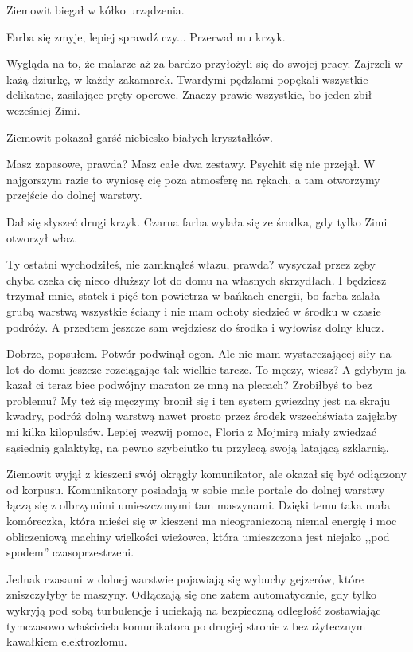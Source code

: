 Ziemowit biegał w kółko urządzenia.

\ds{} Farba się zmyje, lepiej sprawdź czy... \dm{} Przerwał mu krzyk. \de{}

Wygląda na to, że malarze aż za bardzo przyłożyli się do swojej pracy. 
Zajrzeli w każą dziurkę, w każdy zakamarek.
Twardymi pędzlami popękali wszystkie delikatne, zasilające pręty operowe.
Znaczy prawie wszystkie, bo jeden zbił wcześniej Zimi.

Ziemowit pokazał garść niebiesko-białych kryształków.

\ds{} Masz zapasowe, prawda? Masz całe dwa zestawy. \dm{} Psychit się nie przejął. \dm{}
W najgorszym razie to wyniosę cię poza atmosferę na rękach, a tam otworzymy przejście do dolnej warstwy. \de{}

Dał się słyszeć drugi krzyk. Czarna farba wylała się ze środka, gdy tylko Zimi otworzył właz.

\ds{} Ty ostatni wychodziłeś, nie zamknąłeś włazu, prawda? \dm{} wysyczał przez zęby \dm{} chyba czeka cię nieco dłuższy lot do domu na własnych skrzydłach. 
I będziesz trzymał mnie, statek i pięć ton powietrza w bańkach energii, bo farba zalała grubą warstwą wszystkie ściany i nie mam ochoty siedzieć w środku w czasie podróży.
A przedtem jeszcze sam wejdziesz do środka i wyłowisz dolny klucz. \de{}

\ds{} Dobrze, popsułem. \dm{} Potwór podwinął ogon. \dm{} Ale nie mam wystarczającej siły na lot do domu jeszcze rozciągając tak wielkie tarcze. To męczy, wiesz? 
A gdybym ja kazał ci teraz biec podwójny maraton ze mną na plecach? Zrobiłbyś to bez problemu? My też się męczymy \dm{} bronił się \dm{} 
i ten system gwiezdny jest na skraju kwadry, podróż dolną warstwą nawet prosto przez środek wszechświata zajęłaby mi kilka kilopulsów. 
Lepiej wezwij pomoc, Floria z Mojmirą miały zwiedzać sąsiednią galaktykę, na pewno szybciutko tu przylecą swoją latającą szklarnią. \de{}

Ziemowit wyjął z kieszeni swój okrągły komunikator, ale okazał się być odłączony od korpusu.
Komunikatory posiadają w sobie małe portale do dolnej warstwy łączą się z olbrzymimi umieszczonymi tam maszynami. Dzięki temu taka mała komóreczka, która mieści się w kieszeni
ma nieograniczoną niemal energię i moc obliczeniową machiny wielkości wieżowca, która umieszczona jest niejako ,,pod spodem'' czasoprzestrzeni.

Jednak czasami w dolnej warstwie pojawiają się wybuchy gejzerów, które zniszczyłyby te maszyny. Odłączają się one zatem automatycznie, gdy tylko wykryją pod sobą turbulencje i uciekają na bezpieczną odległość 
zostawiając tymczasowo właściciela komunikatora po drugiej stronie z bezużytecznym kawałkiem elektrozłomu.


